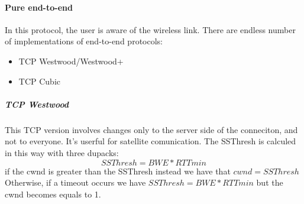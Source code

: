 \paragraph*{Pure end-to-end} In this protocol, the user is aware of the wireless
link. There are endless number of implementations of end-to-end protocols:
\begin{itemize}
\item TCP Westwood/Westwood+
\item TCP Cubic 
\end{itemize}

\subparagraph*{TCP Westwood} This TCP version involves changes only to the
server side of the conneciton, and not to everyone. It's userful for satellite
comunication.
The SSThresh is calculed in this way with three dupacks:
\begin{equation}
SSThresh = BWE * RTTmin
\end{equation}
if the cwnd is greater than the SSThresh instead we have that $cwnd=SSThresh$
Otherwise, if a timeout occurs we have $SSThresh = BWE * RTTmin$ but the cwnd
becomes equals to 1.
